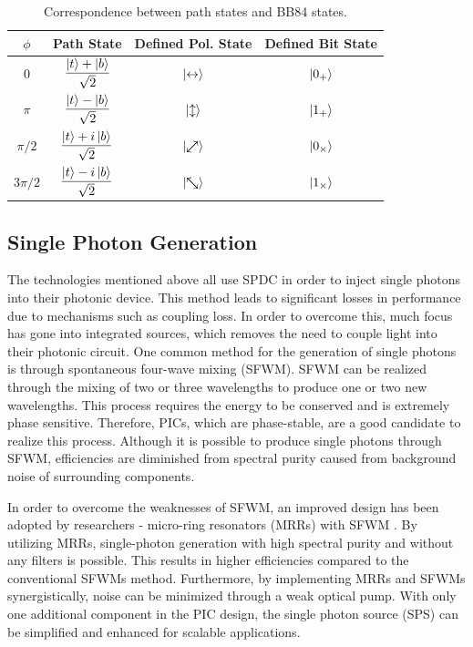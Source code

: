 \documentclass[letterpaper, 10 pt, conference]{ieeeconf}  %
\newcommand{\nwsearrow}{%
  \mathrel{\text{\ooalign{$\nwarrow$\cr$\searrow$}}}%
}
\newcommand{\neswarrow}{%
  \mathrel{\text{\ooalign{$\swarrow$\cr$\nearrow$}}}%
}
\begin{document}
\begin{table}[!ht]
\caption{Correspondence between path states and BB84 states.}
\label{tab:tab1}
\centering
\begin{tabular}{|c|c|c|c|}
\hline
\textbf{$\phi$} & \textbf{Path State} & \textbf{Defined Pol. State} & \textbf{Defined Bit State} \\ \hline
$0$ & $\dfrac{\ket{t} + \ket{b}}{\sqrt{2}}$ & $\ket{\leftrightarrow}$ & $\ket{0_+}$ \\ \hline
$\pi$ & $\dfrac{\ket{t} - \ket{b}}{\sqrt{2}}$ & $\ket{\updownarrow}$ & $\ket{1_+}$ \\ \hline
$\pi/2$ & $\dfrac{\ket{t} + i\ket{b}}{\sqrt{2}}$ & $\ket{\neswarrow}$ & $\ket{0_\times}$ \\ \hline
$3\pi/2$ & $\dfrac{\ket{t} - i\ket{b}}{\sqrt{2}}$ & $\ket{\nwsearrow}$ & $\ket{1_\times}$ \\ \hline
\end{tabular}
\end{table}

\pagebreak

\subsection{Single Photon Generation}
The technologies mentioned above all use SPDC in order to inject single photons into their photonic device. This method leads to significant losses in performance due to mechanisms such as coupling loss. In order to overcome this, much focus has gone into integrated sources, which removes the need to couple light into their photonic circuit. One common method for the generation of single photons is through spontaneous four-wave mixing (SFWM). SFWM can be realized through the mixing of two or three wavelengths to produce one or two new wavelengths. This process requires the energy to be conserved and is extremely phase sensitive. Therefore, PICs, which are phase-stable, are a good candidate to realize this process. Although it is possible to produce single photons through SFWM, efficiencies are diminished from spectral purity caused from background noise of surrounding components. 

In order to overcome the weaknesses of SFWM, an improved design has been adopted by researchers - micro-ring resonators (MRRs) with SFWM \cite{SPS}. By utilizing MRRs, single-photon generation with high spectral purity and without any filters is possible. This results in higher efficiencies compared to the conventional SFWMs method. Furthermore, by implementing MRRs and SFWMs synergistically, noise can be minimized through a weak optical pump. With only one additional component in the PIC design, the single photon source (SPS) can be simplified and enhanced for scalable applications.
\end{document}
